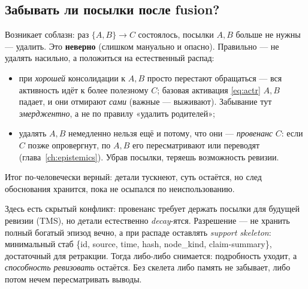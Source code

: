 \subsection{Забывать ли посылки после fusion?}

Возникает соблазн: раз $\{A,B\}\to C$ состоялось, посылки $A,B$ больше не нужны —
удалить. Это \textbf{неверно} (слишком мануально и опасно). Правильно — не удалять
насильно, а положиться на естественный распад:

\begin{itemize}\itemsep1pt
\item при \emph{хорошей} консолидации к $A,B$ просто перестают обращаться — вся
активность идёт к более полезному $C$; базовая активация \eqref{eq:actr} $A,B$
падает, и они отмирают \emph{сами} (важные — выживают). Забывание тут
\emph{эмерджентно}, а не по правилу «удалить родителей»;
\item удалять $A,B$ немедленно нельзя ещё и потому, что они — \emph{провенанс} $C$:
если $C$ позже опровергнут, по $A,B$ его пересматривают или переводят
(глава~\ref{ch:epistemics}). Убрав посылки, теряешь возможность ревизии.
\end{itemize}
Итог по-человечески верный: детали тускнеют, суть остаётся, но след обоснования
хранится, пока не осыпался по неиспользованию.

\begin{principle}
Здесь есть скрытый конфликт: провенанс требует держать посылки для будущей ревизии
(TMS), но детали естественно \emph{decay}-ятся. Разрешение — не хранить полный
богатый эпизод вечно, а при распаде оставлять \emph{support skeleton}: минимальный
стаб \{id, source, time, hash, node\_kind, claim-summary\}, достаточный для ретракции.
Тогда либо-либо снимается: подробность уходит, а \emph{способность ревизовать}
остаётся. Без скелета либо память не забывает, либо потом нечем пересматривать
выводы.
\end{principle}
